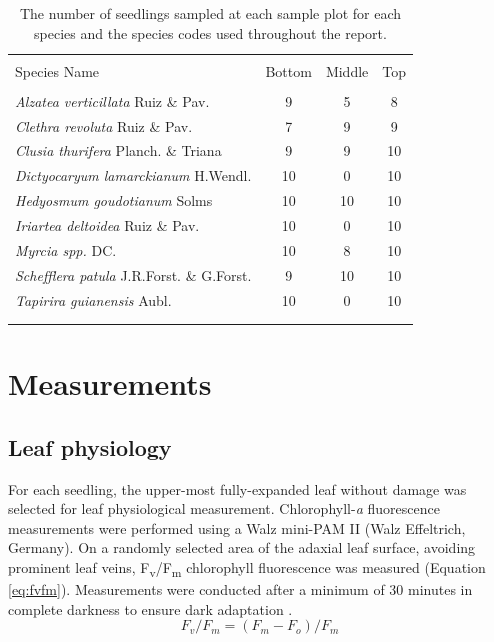 \documentclass[a4paper,10pt,]{report}
\begin{document}
\begin{table}[H] 
\centering 
  \caption{The number of seedlings sampled at each sample plot for each species and the species codes used throughout the report.} 
  \label{table:speciesnumseed} 
\begin{tabular}{@{\extracolsep{5pt}} lSSS} 
\\[-1.8ex]\hline 
\hline \\[-1.8ex] 
Species Name  & {Bottom} & {Middle} & {Top} \\ 
\hline \\[-1.8ex] 
\textit{Alzatea verticillata} Ruiz \& Pav.  &  9  &  5  &  8  \\ 
\textit{Clethra revoluta} Ruiz \& Pav.  &  7  &  9  &  9  \\ 
\textit{Clusia thurifera} Planch. \& Triana  &  9  &  9  &  10  \\ 
\textit{Dictyocaryum lamarckianum} H.Wendl.  &  10  &  0  &  10  \\ 
\textit{Hedyosmum goudotianum} Solms  &  10  &  10  &  10  \\ 
\textit{Iriartea deltoidea}  Ruiz \& Pav. &   10  &  0  &  10  \\ 
\textit{Myrcia spp.} DC.  &  10  &  8  &  10  \\ 
\textit{Schefflera patula} J.R.Forst. \& G.Forst.  &   9  &  10  &  10  \\ 
\textit{Tapirira guianensis} Aubl. &  10  &  0  &  10  \\ 
\hline \\[-1.8ex] 
\hline \\

\end{tabular} 
\end{table} 



\section{Measurements}
\subsection*{Leaf physiology}
For each seedling, the upper-most fully-expanded leaf without damage was selected for leaf physiological measurement. Chlorophyll-\textit{a} fluorescence measurements were performed using a Walz mini-PAM II (Walz Effeltrich, Germany). On a randomly selected area of the adaxial leaf surface, avoiding prominent leaf veins, F\textsubscript{v}/F\textsubscript{m} chlorophyll fluorescence was measured \citep{Genty1989} (Equation \ref{eq:fvfm}). Measurements were conducted after a minimum of 30 minutes in complete darkness to ensure dark adaptation \citep{Campbell2007}. 
\begin{equation} \label{eq:fvfm}
F_v/F_m = (F_m - F_o)/F_m
\end{equation}
\end{document}

